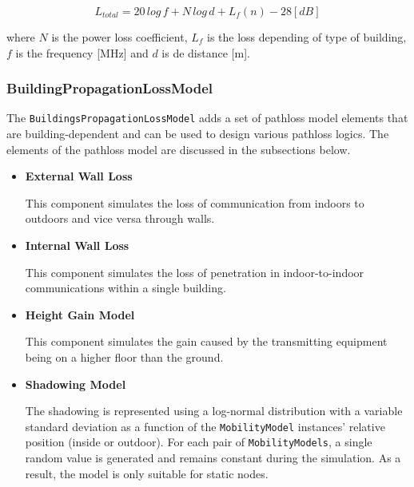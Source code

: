 \begin{equation}
  L_{total} = 20\,log\,f + N\,log\,d + L_f (n) - 28[dB]
\end{equation}

where ${N}$ is the power loss coefficient, ${L_f}$ is the loss depending of type of building,
${f}$ is the frequency [MHz] and ${d}$ is de distance [m].

\subsubsection{BuildingPropagationLossModel}

The \texttt{BuildingsPropagationLossModel} adds a set of pathloss model elements that are 
building-dependent and can be used to design various pathloss logics. The elements of the 
pathloss model are discussed in the subsections below.

\begin{itemize}
  \item \textbf{External Wall Loss}

  This component simulates the loss of communication from indoors to outdoors and vice versa through walls.
  \item \textbf{Internal Wall Loss}

  This component simulates the loss of penetration in indoor-to-indoor communications within a single building.
  \item \textbf{Height Gain Model}

  This component simulates the gain caused by the transmitting equipment being on a higher floor than the ground.
  \item \textbf{Shadowing Model}

  The shadowing is represented using a log-normal distribution with a variable standard deviation
  as a function of the \texttt{MobilityModel} instances' relative position (inside or outdoor). For each 
  pair of \texttt{MobilityModels}, a single random value is generated and remains constant during the 
  simulation. As a result, the model is only suitable for static nodes.
\end{itemize}

